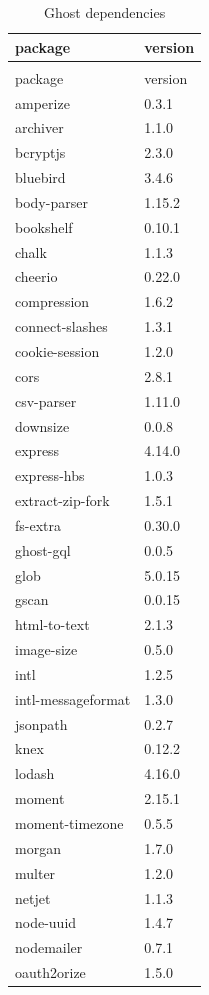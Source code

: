 	\begin{longtable}{ll}
		\caption{Ghost dependencies}\\
		package&version\\
		\hline
		\endfirsthead
		\caption[]{Ghost dependencies}\\
		package&version\\
		\hline
		\endhead
		amperize & 0.3.1 \\
		archiver & 1.1.0 \\
		bcryptjs & 2.3.0  \\
		bluebird & 3.4.6 \\
		body-parser & 1.15.2 \\
		bookshelf & 0.10.1 \\
		chalk & 1.1.3 \\
		cheerio & 0.22.0 \\
		compression & 1.6.2 \\
		connect-slashes & 1.3.1 \\
		cookie-session & 1.2.0 \\
		cors & 2.8.1 \\
		csv-parser & 1.11.0 \\
		downsize & 0.0.8 \\
		express & 4.14.0 \\
		express-hbs & 1.0.3 \\
		extract-zip-fork & 1.5.1 \\
		fs-extra & 0.30.0 \\
		ghost-gql & 0.0.5 \\
		glob & 5.0.15 \\
		gscan & 0.0.15 \\
		html-to-text & 2.1.3 \\
		image-size & 0.5.0 \\
		intl & 1.2.5 \\
		intl-messageformat & 1.3.0 \\
		jsonpath & 0.2.7 \\
		knex & 0.12.2 \\
		lodash & 4.16.0 \\
		moment & 2.15.1 \\
		moment-timezone & 0.5.5 \\
		morgan & 1.7.0 \\
		multer & 1.2.0 \\
		netjet & 1.1.3 \\
		node-uuid & 1.4.7 \\
		nodemailer & 0.7.1 \\
		oauth2orize & 1.5.0 \\

\end{longtable}
